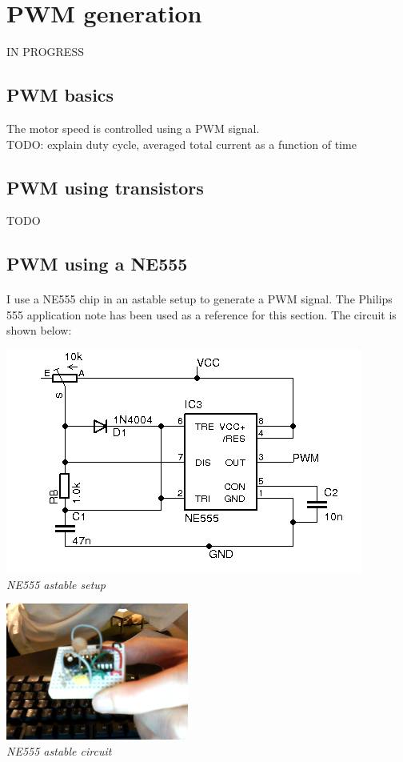 \documentclass[12pt]{article}
\begin{document}
\newpage
\section{PWM generation}
IN PROGRESS

\subsection{PWM basics}
The motor speed is controlled using a PWM signal.\\
TODO: explain duty cycle, averaged total current as a function of time

\subsection{PWM using transistors}
TODO

\subsection{PWM using a NE555}
\paragraph{} I use a NE555 chip in an astable setup to generate a PWM signal. The Philips 555
application note has been used as a reference for this section. The circuit is shown below:
\begin{center}
  \includegraphics[keepaspectratio=true, width=1.\textwidth]{../pics/ne555_astable.png}
  \\
  \smallskip
  \tiny{\textit{NE555 astable setup}}
\end{center}

\begin{center}
  \includegraphics[keepaspectratio=true, width=60mm]{../pics/ne555_astable_circuit.png}
  \\
  \smallskip
  \tiny{\textit{NE555 astable circuit}}
\end{center}
\end{document}
